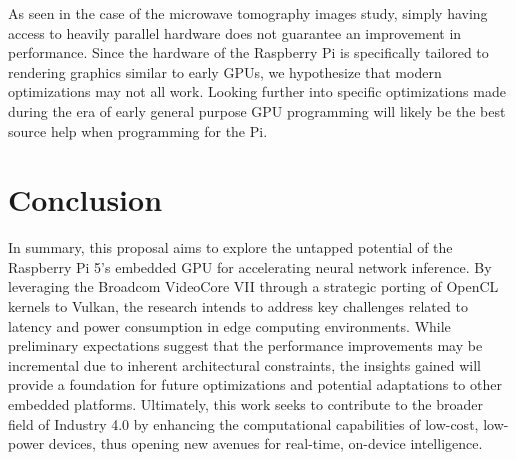 \documentclass[conference]{IEEEtran}
\begin{document}
 As seen in the case of the microwave tomography images study, simply having access to heavily parallel hardware 
 does not guarantee an improvement in performance. Since the hardware of the Raspberry Pi is specifically tailored 
 to rendering graphics similar to early GPUs, we hypothesize that modern optimizations may not all work. 
 Looking further into specific optimizations made during the era of early general purpose GPU programming will likely
 be the best source help when programming for the Pi. 



 

 \section{Conclusion}

 In summary, this proposal aims to explore the untapped potential of the Raspberry Pi 5’s embedded GPU for 
 accelerating neural network inference. By leveraging the Broadcom VideoCore VII through a strategic porting 
 of OpenCL kernels to Vulkan, the research intends to address key challenges related to latency and power 
 consumption in edge computing environments. While preliminary expectations suggest that the performance 
 improvements may be incremental due to inherent architectural constraints, the insights gained will provide a 
 foundation for future optimizations and potential adaptations to other embedded platforms. Ultimately, this 
 work seeks to contribute to the broader field of Industry 4.0 by enhancing the computational capabilities of 
 low-cost, low-power devices, thus opening new avenues for real-time, on-device intelligence.
 
 
 
 
 \vspace{12pt}
 
 
\end{document}
